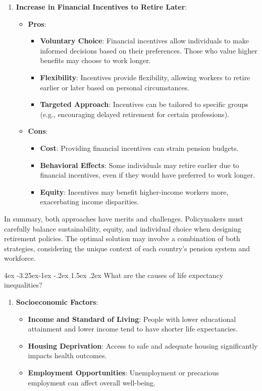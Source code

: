 \documentclass[11pt]{report}
\makeatletter
\renewcommand\subsection{\leftskip 4ex\@startsection{subsection}{2}{\z@}%
	{-3.25ex\@plus -1ex \@minus -.2ex}%
	{1.5ex \@plus .2ex}%
	{\normalfont\large\bfseries}}
\makeatother
\begin{document}
\begin{spacing}{1.5}
\begin{enumerate}[leftmargin=15ex]
	\item  \textbf{Increase in Financial Incentives to Retire Later}:
	\begin{itemize}
		\item \textbf{Pros}:
		\begin{itemize}
			\item \textbf{Voluntary Choice}: Financial incentives allow individuals to make informed decisions based on their preferences. Those who value higher benefits may choose to work longer.
			\item \textbf{Flexibility}: Incentives provide flexibility, allowing workers to retire earlier or later based on personal circumstances.
			\item \textbf{Targeted Approach}: Incentives can be tailored to specific groups (e.g., encouraging delayed retirement for certain professions).
		\end{itemize}
		\item \textbf{Cons}:
		\begin{itemize}
			\item \textbf{Cost}: Providing financial incentives can strain pension budgets.
			\item \textbf{Behavioral Effects}: Some individuals may retire earlier due to financial incentives, even if they would have preferred to work longer.
			\item \textbf{Equity}: Incentives may benefit higher-income workers more, exacerbating income disparities.
		\end{itemize}
	\end{itemize}
	
	\end{enumerate}
	
	In summary, both approaches have merits and challenges. Policymakers must carefully balance sustainability, equity, and individual choice when designing retirement policies. The optimal solution may involve a combination of both strategies, considering the unique context of each country's pension system and workforce.

	\subsection{What are the causes of life expectancy inequalities?}
	\begin{enumerate}[leftmargin=15ex]
		\item \textbf{Socioeconomic Factors}: 
		\begin{itemize} 
			\item \textbf{Income and Standard of Living}: People with lower educational attainment and lower income tend to have shorter life expectancies. 
			\item \textbf{Housing Deprivation}: Access to safe and adequate housing significantly impacts health outcomes. \item \textbf{Employment Opportunities}: Unemployment or precarious employment can affect overall well-being. \end{itemize}
		

\end{enumerate}
\end{spacing}
\end{document}
